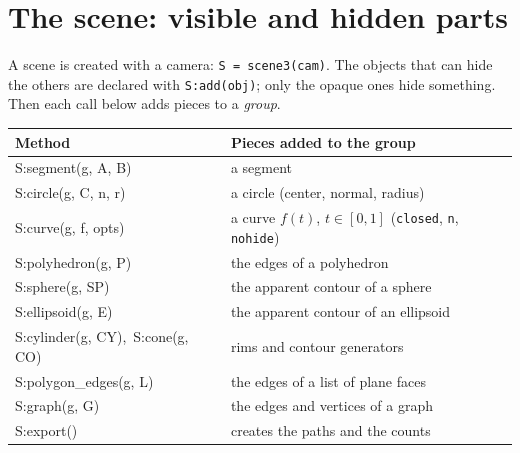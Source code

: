 \documentclass[11pt]{article}
\newcommand\code[1]{\texttt{#1}}
\newenvironment{example}[1]
  {\def\exfile{#1.tex}\VerbatimOut{\exfile}}
  {\endVerbatimOut
   \VerbatimInput[fontsize=\small, frame=single]{\exfile}
   \begin{center}\end{center}}
\begin{document}
\begin{example}{ex-classroom}
\end{example}

\section{The scene: visible and hidden parts}

A scene is created with a camera: \code{S = scene3(cam)}. The objects that
can hide the others are declared with \code{S:add(obj)}; only the opaque
ones hide something. Then each call below adds pieces to a \emph{group}.

\begin{center}
\begin{tabular}{>{\ttfamily}l p{8.8cm}}
\toprule
\textrm{Method} & Pieces added to the group \\
\midrule
S:segment(g, A, B)        & a segment \\
S:circle(g, C, n, r)      & a circle (center, normal, radius) \\
S:curve(g, f, opts)       & a curve $f(t)$, $t\in[0,1]$
                            (\code{closed}, \code{n}, \code{nohide}) \\
S:polyhedron(g, P)        & the edges of a polyhedron \\
S:sphere(g, SP)           & the apparent contour of a sphere \\
S:ellipsoid(g, E)         & the apparent contour of an ellipsoid \\
S:cylinder(g, CY),\ S:cone(g, CO) & rims and contour generators \\
S:polygon\_edges(g, L)    & the edges of a list of plane faces \\
S:graph(g, G)             & the edges and vertices of a graph \\
S:export()                & creates the paths and the counts \\
\bottomrule
\end{tabular}
\end{center}
\end{document}
